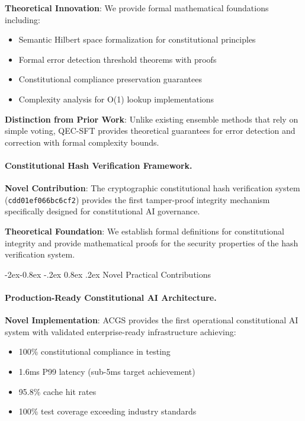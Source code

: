 \documentclass[manuscript,screen,9pt]{acmart}
\makeatletter
\renewcommand\subsubsection{\@startsection{subsubsection}{3}{\z@}%
  {-2ex\@plus -0.8ex \@minus -.2ex}%
  {0.8ex \@plus .2ex}%
  {\normalfont\normalsize\bfseries}}
\makeatother
\begin{document}
\begin{table}[!htb]
\textbf{Theoretical Innovation}: We provide formal mathematical foundations including:
\begin{itemize}[leftmargin=*,itemsep=1pt,parsep=1pt]
    \item Semantic Hilbert space formalization for constitutional principles
    \item Formal error detection threshold theorems with proofs
    \item Constitutional compliance preservation guarantees
    \item Complexity analysis for O(1) lookup implementations
\end{itemize}

\textbf{Distinction from Prior Work}: Unlike existing ensemble methods that rely on simple voting, QEC-SFT provides theoretical guarantees for error detection and correction with formal complexity bounds.

\paragraph{Constitutional Hash Verification Framework.}
\textbf{Novel Contribution}: The cryptographic constitutional hash verification system (\texttt{cdd01ef066bc6cf2}) provides the first tamper-proof integrity mechanism specifically designed for constitutional AI governance.

\textbf{Theoretical Foundation}: We establish formal definitions for constitutional integrity and provide mathematical proofs for the security properties of the hash verification system.

\subsubsection{Novel Practical Contributions}
\label{subsubsec:novel_practical}

\paragraph{Production-Ready Constitutional AI Architecture.}
\textbf{Novel Implementation}: ACGS provides the first operational constitutional AI system with validated enterprise-ready infrastructure achieving:
\begin{itemize}[leftmargin=*,itemsep=1pt,parsep=1pt]
    \item 100\% constitutional compliance in testing
    \item 1.6ms P99 latency (sub-5ms target achievement)
    \item 95.8\% cache hit rates
    \item 100\% test coverage exceeding industry standards
\end{itemize}


\end{table}
\end{document}

